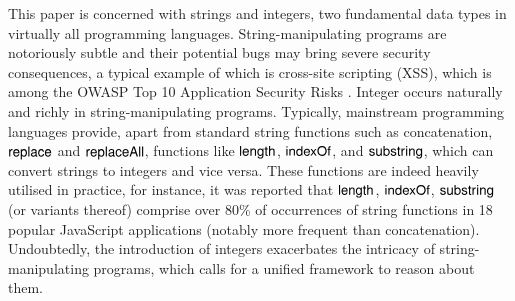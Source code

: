 
This paper is concerned with strings and integers, two fundamental data types in virtually all programming languages.
String-manipulating programs are notoriously subtle and their potential bugs %
may bring severe security consequences, a typical example of which is cross-site scripting
(XSS), which is among the OWASP Top 10 Application Security Risks
\cite{owasp17}. Integer occurs naturally and richly in string-manipulating programs. %
Typically, mainstream programming languages provide, apart from standard string functions such as concatenation, $\mathsf{replace}$ and $\mathsf{replaceAll}$, %
functions like $\mathsf{length}$, $\mathsf{indexOf}$, and $\mathsf{substring}$, which can convert strings to integers and vice versa. %
These functions are indeed heavily utilised in practice, for instance, it was reported \cite{Berkeley-JavaScript} that $\mathsf{length}$, $\mathsf{indexOf}$, $\mathsf{substring}$ (or variants thereof) comprise over 80\% of occurrences of string functions in 18 popular JavaScript applications (notably more frequent than concatenation). Undoubtedly, the introduction of integers exacerbates the intricacy of string-manipulating programs, which calls for a unified framework to reason about them. 







